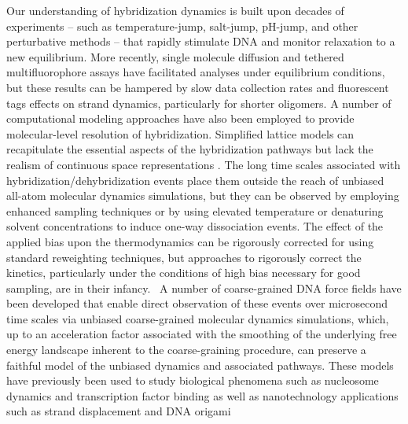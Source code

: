 \documentclass[journal=jpcbfk,manuscript=article]{achemso}
\begin{document}
Our understanding of hybridization dynamics is built upon decades of experiments -- such as temperature-jump, salt-jump, pH-jump, and other perturbative methods -- that rapidly stimulate DNA and monitor relaxation to a new equilibrium.\citep{Morrison1993SensitiveSolution, Wetmur1968KineticsDNA, Craig1971RelaxationOligonucleotides, Porschke1973ThermodynamicsPairs, Williams1989LaserDGCATGC, Narayanan2012ExploringMixing, Chen2007InfluenceHybridization, Sanstead2018DirectDehybridization} More recently, single molecule diffusion and tethered multifluorophore assays have facilitated analyses under equilibrium conditions, but these results can be hampered by slow data collection rates and fluorescent tags effects on strand dynamics, particularly for shorter oligomers.\citep{Liu20173DSolution,  Schickinger2018TetheredHelices, Chen2008Base-by-baseSpectroscopy, Dupuis2013Single-moleculeHelices} A number of computational modeling approaches have also been employed to provide molecular-level resolution of hybridization. Simplified lattice models can recapitulate the essential aspects of the hybridization pathways but lack the realism of continuous space representations \citep{Araque2016LatticeCooperativity, Phys2019}. The long time scales associated with hybridization/dehybridization events place them outside the reach of unbiased all-atom molecular dynamics simulations,\citep{Hinckley2014Coarse-grainedEffects} but they can be observed by employing enhanced sampling techniques\citep{Piana2007AtomisticTransition, Zerze2021ThermodynamicsSimulations, Hinckley2013AnHybridization, Schmitt2013ExploringSurface, Sambriski2009, Sambriski2009SequencePathways, Hoefert2011MolecularOligonucleotides,Romano2013DNADependence, Hinckley2014Coarse-grainedEffects} or by using elevated temperature or denaturing solvent concentrations to induce one-way dissociation events.\citep{Wong2008TheSimulations, Perez2010Real-timeUnfolding} The effect of the applied bias upon the thermodynamics can be rigorously corrected for using standard reweighting techniques, but approaches to rigorously correct the kinetics, particularly under the conditions of high bias necessary for good sampling, are in their infancy.~\citep{Prinz2011OptimalDynamics, Chodera2011DynamicalTemperatures, Stelzl2017DynamicSimulations, Donati2017GirsanovModels, Donati2018GirsanovSimulations, Quer2018ANCOORDINATES} A number of coarse-grained DNA force fields have been developed that enable direct observation of these events over microsecond time scales via unbiased coarse-grained molecular dynamics simulations, \citep{Romano2013DNADependence, Hinckley2013AnHybridization, Maciejczyk2014DNAModel, Markegard2015, Dans2016MultiscaleDNA} which, up to an acceleration factor associated with the smoothing of the underlying free energy landscape inherent to the coarse-graining procedure, can preserve a faithful model of the unbiased dynamics and associated pathways. These models have previously been used to study biological phenomena such as nucleosome dynamics\citep{Lequieu2016Tension-dependentUnwrapping, Lequieu2017InSliding} and transcription factor binding \cite{Terakawa2015P53Simulations, Tan2018DynamicData} as well as nanotechnology applications such as strand displacement \citep{Srinivas2013OnDisplacement, Haley2020DesignDisplacement} and DNA origami 
\end{document}
